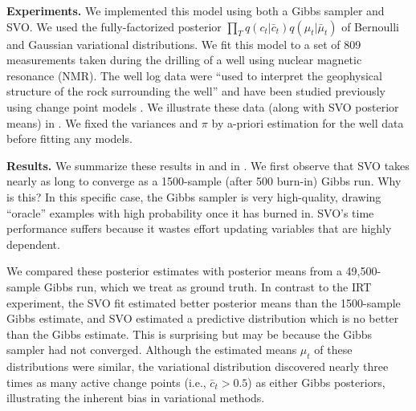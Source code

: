 \textbf{Experiments.} We implemented this model using both a Gibbs
sampler and SVO. We used the fully-factorized posterior $\prod_T
q(c_t | \bar c_t) q(\mu_t | \bar \mu_t)$ of Bernoulli and Gaussian variational
distributions. We fit this model to a set of 809 measurements taken
during the drilling of a well using nuclear magnetic resonance
(NMR). The well log data were ``used to interpret the geophysical
structure of the rock surrounding the well'' \citep{adams:2007} and
have been studied previously using change point models
\citep{ruanaidh:1996,adams:2007}. We illustrate these data (along with
SVO posterior means) in . We fixed the
variances and $\pi$ by a-priori estimation for the well data before
fitting any models.

\textbf{Results.} We summarize these results in
 and in .
We first observe that SVO takes nearly as long to converge as a
1500-sample (after 500 burn-in) Gibbs run.  Why is this? In this
specific case, the Gibbs sampler is very high-quality, drawing
``oracle'' examples with high probability once it has burned in. SVO's
time performance suffers because it wastes effort updating variables
that are highly dependent.

We compared these posterior estimates with posterior means from a
49,500-sample Gibbs run, which we treat as ground truth.  In contrast
to the IRT experiment, the SVO fit estimated better posterior means
than the 1500-sample Gibbs estimate, and SVO estimated a predictive
distribution which is no better than the Gibbs estimate. This is
surprising but may be because the Gibbs sampler had not
converged. Although the estimated means $\mu_t$ of these distributions
were similar, the variational distribution discovered nearly three
times as many active change points (i.e., $\bar c_t > 0.5$) as either Gibbs
posteriors, illustrating the inherent bias in variational methods.



